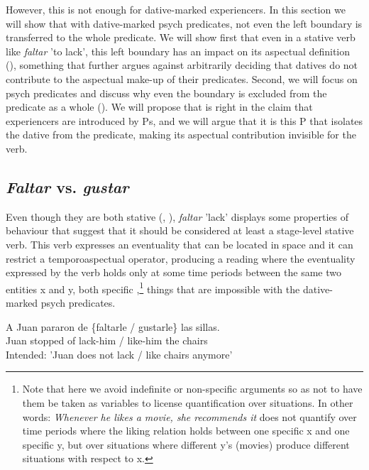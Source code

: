 \documentclass[output=paper,colorlinks,citecolor=brown,nonflat]{./langscibook}
\begin{document}
However, this is not enough for dative-marked experiencers. In this section we will show that with dative-marked psych predicates, not even the left boundary is transferred to the whole predicate. We will show first that even in a stative verb like \textit{faltar} 'to lack', this left boundary has an impact on its aspectual definition (), something that further argues against arbitrarily deciding that datives do not contribute to the aspectual make-up of their predicates. Second, we will focus on psych predicates and discuss why even the boundary is excluded from the predicate as a whole (). We will propose that \citet{Landau2010} is right in the claim that experiencers are introduced by Ps, and we will argue that it is this P that isolates the dative from the predicate, making its aspectual contribution invisible for the verb.

\subsection{\textit{Faltar} vs. \textit{gustar}}\label{sec:fabregas:3.1}

Even though they are both stative (, \citealt{GarcíaFernándezGutiérrezBergarecheMartinez2006}), \textit{faltar} {}'lack' displays some properties of behaviour that suggest that it should be considered at least a stage-level stative verb. This verb expresses an eventuality that can be located in space  and it can restrict a temporoaspectual operator, producing a reading where the eventuality expressed by the verb holds only at some time periods between the same two entities x and y, both specific \citet[cf. 27]{Kratzer1995},\footnote{Note that here we avoid indefinite or non-specific arguments so as not to have them be taken as variables to license quantification over situations. In other words: \textit{Whenever he likes a movie, she recommends it} does not quantify over time periods where the liking relation holds between one specific x and one specific y, but over situations where different y's (movies) produce different situations with respect to x.} things that are impossible with the dative-marked psych predicates.

\ea%
    \label{ex:fabregas:25}
    \gll    *A Juan  pararon de \{faltarle / gustarle\} las  sillas.\\
             {Juan} {stopped} {of}   {lack-him} {/} {like-him} {the} {chairs}\\
    \glt    Intended: 'Juan does not lack / like chairs anymore'
    \z
\end{document}
